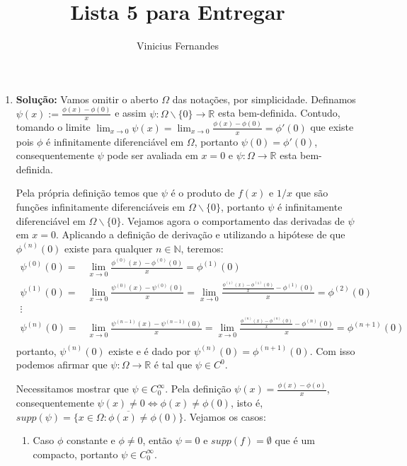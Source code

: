 \documentclass{article}
\begin{document}
	
	\title{Lista 5 para Entregar}
	\author{Vinicius Fernandes}
	
	\maketitle
	
	\begin{enumerate}
		
		\item \textbf{Solução:} Vamos omitir o aberto $\Omega$ das notações, por simplicidade. Definamos $\psi(x) := \frac{\phi(x) - \phi(0)}{x}$ e assim $\psi:\Omega\backslash\{0\} \to \mathbb{R}$ esta bem-definida. Contudo, tomando o limite $\lim_{x \to 0} \psi(x) = \lim_{x \to 0} \frac{\phi(x) - \phi(0)}{x} = \phi'(0)$ que existe pois $\phi$ é infinitamente diferenciável em $\Omega$, portanto $\psi(0) = \phi'(0)$, consequentemente $\psi$ pode ser avaliada em $x=0$ e $\psi:\Omega \to \mathbb{R}$ esta bem-definida. 
		
		Pela própria definição temos que $\psi$ é o produto de $f(x)$ e $1/x$ que são funções infinitamente diferenciáveis em $\Omega \backslash\{0\}$, portanto $\psi$ é infinitamente diferenciável em $\Omega \backslash\{0\}$. Vejamos agora o comportamento das derivadas de $\psi$ em $x=0$. Aplicando a definição de derivação e utilizando a hipótese de que $\phi^{(n)}(0)$ existe para qualquer $n \in \mathbb{N}$, teremos:
		$$
		\begin{aligned}
		\psi^{(0)}(0) 
		= & \lim_{x \to 0}\frac{\phi^{(0)}(x) - \phi^{(0)}(0)}{x} = \phi^{(1)}(0) \\
		\psi^{(1)}(0) 
		= & \lim_{x \to 0}\frac{\psi^{(0)}(x) - \psi^{(0)}(0)}{x} = \lim_{x \to 0}\frac{\frac{\phi^{(1)}(x) - \phi^{(1)}(0)}{x} - \phi^{(1)}(0)}{x} = \phi^{(2)}(0) \\
		\vdots & \\
		\psi^{(n)}(0) 
		= & \lim_{x \to 0}\frac{\psi^{(n-1)}(x) - \psi^{(n-1)}(0)}{x} = \lim_{x \to 0}\frac{\frac{\phi^{(n)}(x) - \phi^{(n)}(0)}{x} - \phi^{(n)}(0)}{x} = \phi^{(n+1)}(0) \\
		\end{aligned}
		$$
		portanto, $\psi^{(n)}(0)$ existe e é dado por $\psi^{(n)}(0) = \phi^{(n+1)}(0)$. Com isso podemos afirmar que $\psi:\Omega \to \mathbb{R}$ é tal que $\psi \in C^{0}$. 
		
		Necessitamos mostrar que $\psi \in C^{\infty}_{0}$. Pela definição $\psi(x) = \frac{\phi(x) - \phi(o)}{x}$, consequentemente $\psi(x) \neq 0 \iff \phi(x) \neq \phi(0)$, isto é, $supp(\psi) = \overline{ \{x \in \Omega: \phi(x) \neq \phi(0)\} }$. Vejamos os casos:
		\begin{enumerate}
			\item Caso $\phi$ constante e $\phi \neq 0$, então $\psi = 0$ e $supp(f) = \emptyset$ que é um compacto, portanto $\psi \in C^{\infty}_{0}$.
			

\end{enumerate}
\end{enumerate}
\end{document}
